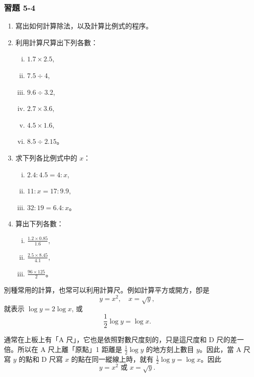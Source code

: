 \subsubsection*{習題 5-4}
\begin{enumerate}
    \item 寫出如何計算除法，以及計算比例式的程序。
    \item 利用計算尺算出下列各數：
    \begin{enumerate}[(i)]
        \item $1.7 \times 2.5$,
        \item $7.5 \div 4$,
        \item $9.6 \div 3.2$,
        \item $2.7 \times 3.6$,
        \item $4.5 \times 1.6$,
        \item $8.5 \div 2.15$。
    \end{enumerate}
    \item 求下列各比例式中的 $x$：
    \begin{enumerate}[(i)]
        \item $2.4 : 4.5 = 4 : x$,
        \item $11 : x = 17 : 9.9$,
        \item $32 : 19 = 6.4 : x$。
    \end{enumerate}
    \item 算出下列各數：
    \begin{enumerate}[(i)]
        \item $\frac{1.2 \times 0.85}{1.6}$,
        \item $\frac{2.5 \times 8.45}{4.1}$,
        \item $\frac{96 \times 125}{2}$。
    \end{enumerate}
\end{enumerate}

別種常用的計算，也常可以利用計算尺。例如計算平方或開方，卽是
\[
y = x^2, \quad x = \sqrt{y},
\]
就表示 $\log y = 2 \log x$, 或
\[
\frac{1}{2}\log y = \log x.
\]

通常在上板上有「A 尺」，它也是依照對數尺度刻的，只是這尺度和 D 尺的差一倍。所以在 A 尺上離「原點」1 距離是 $\frac{1}{2}\log y$ 的地方刻上數目 $y$。因此，當 A 尺寫 $y$ 的點和 D 尺寫 $x$ 的點在同一縱線上時，就有 $\frac{1}{2}\log y = \log x$。因此
\[
y = x^2 \text{ 或 } x = \sqrt{y}.
\]

